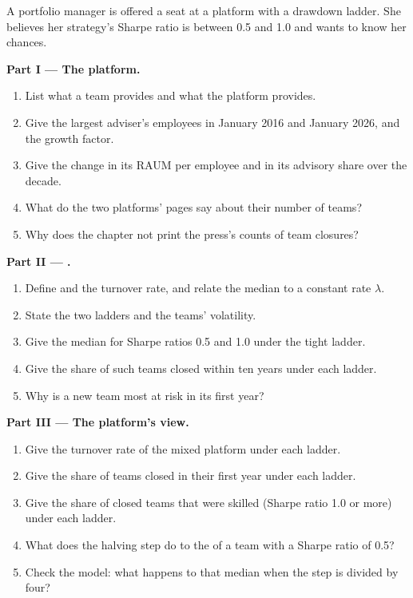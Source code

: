 \begin{problem}\label{pb:in:multi-manager-platforms:1}
A portfolio manager is offered a seat at a platform with a drawdown ladder. She believes her strategy's Sharpe ratio is
between 0.5 and 1.0 and wants to know her chances.

\medskip\noindent\textbf{Part I --- The platform.}
\begin{enumerate}
\item List what a team provides and what the platform provides.
\item Give the largest adviser's employees in January 2016 and January 2026, and the growth factor.
\item Give the change in its RAUM per employee and in its advisory share over the decade.
\item What do the two platforms' pages say about their number of teams?
\item Why does the chapter not print the press's counts of team closures?
\end{enumerate}

\medskip\noindent\textbf{Part II --- .}
\begin{enumerate}[resume]
\item Define  and the turnover rate, and relate the median  to a constant rate $\lambda$.
\item State the two ladders and the teams' volatility.
\item Give the median  for Sharpe ratios 0.5 and 1.0 under the tight ladder.
\item Give the share of such teams closed within ten years under each ladder.
\item Why is a new team most at risk in its first year?
\end{enumerate}

\medskip\noindent\textbf{Part III --- The platform's view.}
\begin{enumerate}[resume]
\item Give the turnover rate of the mixed platform under each ladder.
\item Give the share of teams closed in their first year under each ladder.
\item Give the share of closed teams that were skilled (Sharpe ratio 1.0 or more) under each ladder.
\item What does the halving step do to the  of a team with a Sharpe ratio of 0.5?
\item Check the model: what happens to that median when the step is divided by four?
\end{enumerate}


\end{problem}
